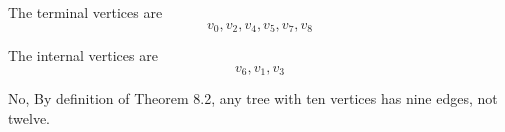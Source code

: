 \documentclass{report}
\begin{document}
The terminal vertices are {\large{$$v_0, v_2, v_4, v_5, v_7, v_8$$}}
\vspace{3mm}

The internal vertices are {\large{$$v_6, v_1, v_3$$}}
\bigbreak \noindent \bigbreak \noindent
\vspace{2mm}


No, By definition of Theorem 8.2, any tree with ten vertices has nine edges, not twelve.
\pagebreak
{}
\end{document}
